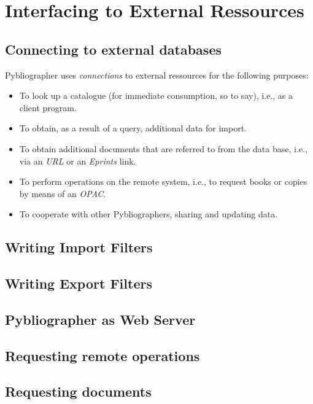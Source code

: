 
\section{Interfacing to  External Ressources}
\label{sec:external}





\subsection{Connecting to external databases}
\label{sec:extconn}

Pybliographer uses \textit{connections} to external ressources for the
following purposes:
\begin{itemize}
\item To look up a catalogue (for immediate consumption, so to say),
  i.e., as a client program.
\item To obtain, as a result of a query, additional data for import.
\item To obtain additional documents that are referred to from the
  data base, i.e., via an \textit{URL} or an \textit{Eprints} link.
\item To perform operations on the remote system, i.e., to request
  books or copies by means of an \textit{OPAC}. 
\item \Think To cooperate with other Pybliographers, sharing and
  updating data.

\end{itemize}



\subsection{Writing Import Filters}
\label{sec:importfilter}



\subsection{Writing Export Filters}
\label{sec:exportfilter}


\subsection{Pybliographer as Web Server }
\label{sec:pybweb}


\subsection{Requesting remote operations}
\label{sec:remotereq}


\subsection{Requesting documents}
\label{sec:docrequest}



